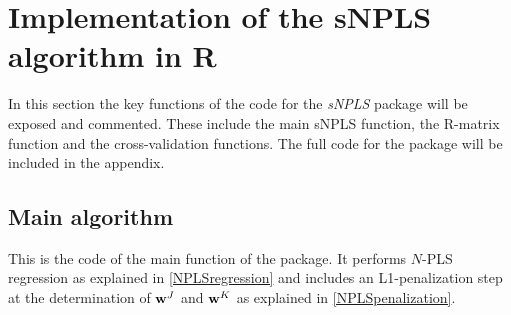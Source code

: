 \section{Implementation of the sNPLS algorithm in R}
In this section the key functions of the code for the \textit{sNPLS} package will be exposed and commented. These include the main sNPLS function, the R-matrix function and the cross-validation functions. The full code for the package will be included in the appendix.

\subsection{Main algorithm}
This is the code of the main function of the package. It performs $N$-PLS regression as explained in \autoref{NPLSregression} and includes an L1-penalization step at the determination of $\textbf{\text{w}}^{J}$ and $\textbf{\text{w}}^{K}$ as explained in \autoref{NPLSpenalization}.
\vspace{15pt}
